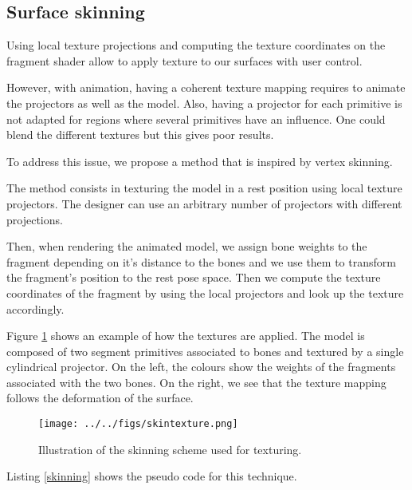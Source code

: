 \documentclass[annual]{acmsiggraph}
\begin{document}
\subsection{Surface skinning}

Using local texture projections and computing the texture coordinates on the fragment shader allow to apply texture to our surfaces with user control.

However, with animation, having a coherent texture mapping requires to animate the projectors as well as the model.
Also, having a projector for each primitive is not adapted for regions where several primitives have an influence.
One could blend the different textures but this gives poor results.

To address this issue, we propose a method that is inspired by vertex skinning.

The method consists in texturing the model in a rest position using local texture projectors.
The designer can use an arbitrary number of projectors with different projections.

Then, when rendering the animated model, we assign bone weights to the fragment depending on it's distance to the bones and we use them to transform the fragment's position to the rest pose space. Then we compute the texture coordinates of the fragment by using the local projectors and look up the texture accordingly.

Figure \ref{weightSkin} shows an example of how the textures are applied. The model is composed of two segment primitives associated to bones and textured by a single cylindrical projector. On the left, the colours show the weights of the fragments associated with the two bones. On the right, we see that the texture mapping follows the deformation of the surface.

\begin{figure}[ht]
  \centering
  \texttt{[image: ../../figs/skintexture.png]}
  \caption{Illustration of the skinning scheme used for texturing.}
  \label{weightSkin}
\end{figure}

Listing \ref{skinning} shows the pseudo code for this technique.
\end{document}
